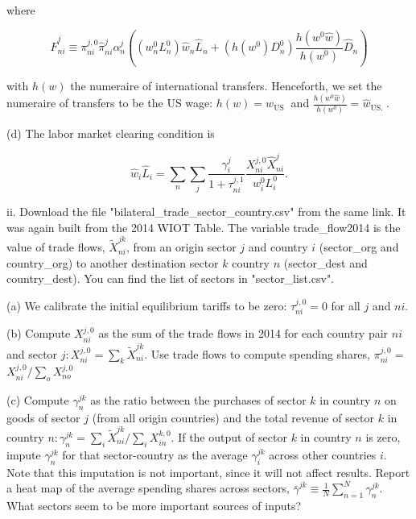 \documentclass[12pt,oneside,reqno]{article}
\begin{document}
\begin{enumerate}
where

\begin{equation*}
\hat{F}_{n i}^{j} \equiv \pi_{n i}^{j, 0} \hat{\pi}_{n i}^{j} \alpha_{n}^{j}\left(\left(w_{n}^{0} L_{n}^{0}\right) \hat{w}_{n} \hat{L}_{n}+\left(h\left(w^{0}\right) D_{n}^{0}\right) \frac{h\left(w^{0} \hat{w}\right)}{h\left(w^{0}\right)} \hat{D}_{n}\right)
\end{equation*}

with $h(w)$ the numeraire of international transfers. Henceforth, we set the numeraire of transfers to be the US wage: $h(w)=w_{\text {US }}$ and $\frac{h\left(w^{0} \hat{w}\right)}{h\left(w^{0}\right)}=\hat{w}_{\text {US. }}$.

(d) The labor market clearing condition is

\begin{equation*}
\hat{w}_{i} \hat{L}_{i}=\sum_{n} \sum_{j} \frac{\gamma_{i}^{j}}{1+\tau_{n i}^{j, 1}} \frac{X_{n i}^{j, 0} \hat{X}_{n i}^{j}}{w_{i}^{0} L_{i}^{0}} .
\end{equation*}

ii. Download the file "bilateral\_trade\_sector\_country.csv" from the same link. It was again built from the 2014 WIOT Table. The variable trade\_flow2014 is the value of trade flows, $\tilde{X}_{n i}^{j k}$, from an origin sector $j$ and country $i$ (sector\_org and country\_org) to another destination sector $k$ country $n$ (sector\_dest and country\_dest). You can find the list of sectors in "sector\_list.csv".

(a) We calibrate the initial equilibrium tariffs to be zero: $\tau_{n i}^{j, 0}=0$ for all $j$ and $n i$.

(b) Compute $X_{n i}^{j, 0}$ as the sum of the trade flows in 2014 for each country pair $n i$ and sector $j: X_{n i}^{j, 0}=\sum_{k} \tilde{X}_{n i}^{j k}$. Use trade flows to compute spending shares, $\pi_{n i}^{j, 0}=$ $X_{n i}^{j, 0} / \sum_{o} X_{n o}^{j, 0}$

(c) Compute $\gamma_{n}^{j k}$ as the ratio between the purchases of sector $k$ in country $n$ on goods of sector $j$ (from all origin countries) and the total revenue of sector $k$ in country $n: \gamma_{n}^{j k}=\sum_{i} \tilde{X}_{n i}^{j k} / \sum_{i} X_{i n}^{k, 0}$. If the output of sector $k$ in country $n$ is zero, impute $\gamma_{n}^{j k}$ for that sector-country as the average $\gamma_{i}^{j k}$ across other countries $i$. Note that this imputation is not important, since it will not affect results. Report a heat map of the average spending shares across sectors, $\bar{\gamma}^{j k} \equiv \frac{1}{N} \sum_{n=1}^{N} \gamma_{n}^{j k}$. What sectors seem to be more important sources of inputs?


\end{enumerate}
\end{document}
